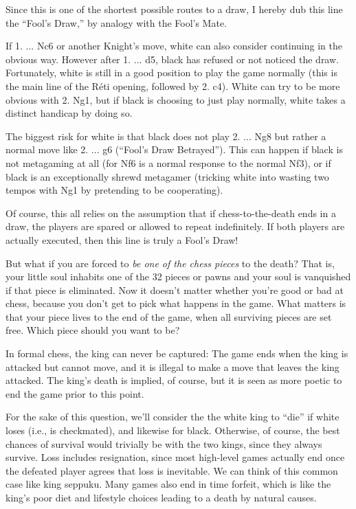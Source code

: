 \documentclass[twocolumn]{article}
\begin{document}
{  Since this is one of the shortest possible routes to a draw, I hereby
  dub this line the ``Fool's Draw,'' by analogy with the Fool's Mate.

  If 1. ... Nc6 or another Knight's move, white can also consider
  continuing in the obvious way. However after 1. ... d5, black has
  refused or not noticed the draw. Fortunately, white is still in a
  good position to play the game normally (this is the main line of
  the R\'eti opening, followed by 2. c4). White can try to be more
  obvious with 2. Ng1, but if black is choosing to just play normally,
  white takes a distinct handicap by doing so.

  The biggest risk for white is that black does not play 2. ... Ng8
  but rather a normal move like 2. ... g6 (``Fool's Draw Betrayed'').
  This can happen if black is not metagaming at all (for Nf6 is a
  normal response to the normal Nf3), or if black is an exceptionally
  shrewd metagamer (tricking white into wasting two tempos with Ng1
  by pretending to be cooperating).

  Of course, this all relies on the assumption that if
  chess-to-the-death ends in a draw, the players are spared or allowed
  to repeat indefinitely. If both players are actually executed, then
  this line is truly a Fool's Draw!
}

But what if you are forced to {\it be one of the chess pieces} to the
death? That is, your little soul inhabits one of the 32 pieces or
pawns and your soul is vanquished if that piece is eliminated. Now it
doesn't matter whether you're good or bad at chess, because you don't
get to pick what happens in the game. What matters is that your piece
lives to the end of the game, when all surviving pieces are set free.
Which piece should you want to be?

In formal chess, the king can never be captured: The game ends when
the king is attacked but cannot move, and it is illegal to make a move
that leaves the king attacked. The king's death is implied, of course,
but it is seen as more poetic to end the game prior to this point.

For the sake of this question, we'll consider the the white king to
``die'' if white loses (i.e., is checkmated), and likewise for black.
Otherwise, of course, the best chances of survival would trivially be
with the two kings, since they always survive. Loss includes
resignation, since most high-level games actually end once the
defeated player agrees that loss is inevitable. We can think of this
common case like king seppuku. Many games also end in time forfeit,
which is like the king's poor diet and lifestyle choices leading to
a death by natural causes.
\end{document}
